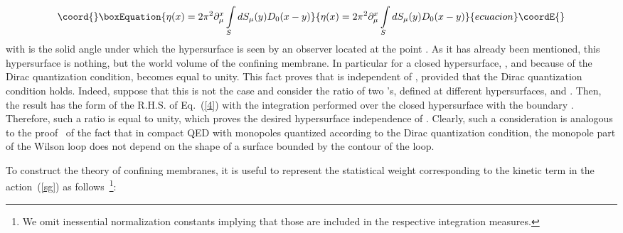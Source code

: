 \documentclass[a4paper,12pt]{article}
\begin{document}
\begin{equation}\coord{}\boxEquation{
\label{solid}
\eta(x)=2\pi^2\partial_\mu^x\int
\limits_{S}^{} dS_\mu(y)D_0(x-y)
}{
\eta(x)=2\pi^2\partial_\mu^x\int
\limits_{S}^{} dS_\mu(y)D_0(x-y)
}{ecuacion}\coordE{}\end{equation}
with \coordHE{} is the solid
angle under which the hypersurface \coordHE{} is seen by an observer located at the point \coordHE{}. As it has already been mentioned, 
this hypersurface is nothing, but the world volume of the confining membrane.
In particular for a closed hypersurface, \coordHE{}, and because of the Dirac quantization condition, 
\coordHE{} becomes equal to unity. This fact proves that \coordHE{}
is independent of \coordHE{}, provided that the Dirac quantization condition holds.
Indeed, suppose that this is not the case and consider the ratio of two  \coordHE{}'s,
defined at different hypersurfaces, \coordHE{} and \coordHE{}. Then, the result has the form of the R.H.S. of Eq.~(\ref{4}) with the 
integration performed over the closed hypersurface with the boundary \coordHE{}.
Therefore, such a ratio is equal to unity, which proves the desired hypersurface independence of  
\coordHE{}.
Clearly, such a consideration is analogous to the proof~\cite{4} of the fact that in compact QED with monopoles
quantized according to the Dirac quantization condition,
the monopole part of the Wilson loop does not depend on the shape of a surface bounded by the 
contour of the loop.

To construct the theory of confining membranes, it is useful to represent
the statistical weight corresponding to the kinetic term in the action~(\ref{sg}) as follows~\footnote{
We omit inessential normalization constants implying that those are included in the respective
integration measures.}:
\end{document}
